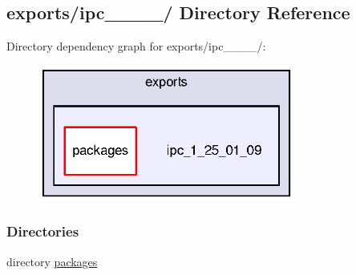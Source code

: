 \subsection{exports/ipc\-\_\-\_\-\_\-\_/ Directory Reference}
\label{dir_3e5426f237af51a615cd732bd4247ee5}
Directory dependency graph for exports/ipc\-\_\-\_\-\_\-\_/\-:
\nopagebreak
\begin{figure}[H]
\begin{center}
\leavevmode
\includegraphics[width=239pt]{dir_3e5426f237af51a615cd732bd4247ee5_dep}
\end{center}
\end{figure}
\subsubsection*{Directories}
\begin{DoxyCompactItemize}
\item 
directory \hyperlink{dir_c81e32b884ba855ce5587fd135c55c19}{packages}
\end{DoxyCompactItemize}
